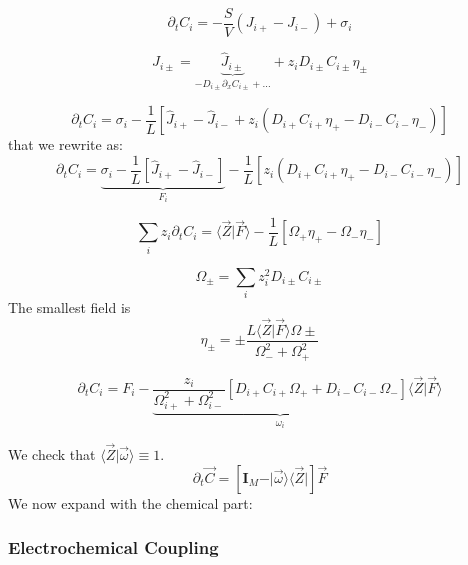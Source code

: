 \documentclass[aps,12pt]{revtex4}
\begin{document}
\begin{equation}
	\partial_t C_i = -\dfrac{S}{V}(J_{i+}-J_{i-}) + \sigma_i
\end{equation}

\begin{equation}
	J_{i\pm} = \underbrace{\hat J_{i\pm}}_{-D_{i\pm} \partial_x C_{i\pm}+\ldots} + z_i D_{i\pm} C_{i\pm} \eta_\pm
\end{equation}

\begin{equation}
	\partial_t C_i = \sigma_i -\dfrac{1}{L} \left[ \hat J_{i+}- \hat J_{i-} + z_i (D_{i+} C_{i+} \eta_+ - D_{i-}C_{i-} \eta_-) \right] 
\end{equation}
that we rewrite as:
\begin{equation}
	\partial_t C_i =
	 \underbrace{\sigma_i -\dfrac{1}{L} \left[ \hat J_{i+}- \hat J_{i-} \right]}_{F_i} 
	 - \dfrac{1}{L}  \left[ z_i (D_{i+} C_{i+} \eta_+ - D_{i-}C_{i-} \eta_-)\right] 
\end{equation}


\begin{equation}
	\sum_i z_i \partial_t C_i =  \langle \vec Z \vert \vec F \rangle - \dfrac{1}{L} \left[ \Omega_+ \eta_{+} - \Omega_- \eta_-\right]
\end{equation}

\begin{equation}
	\Omega_\pm = \sum_i z_i^2 D_{i\pm} C_{i\pm}
\end{equation}
The smallest field is 
\begin{equation}
	\eta_\pm = \pm \dfrac{L \langle \vec Z \vert \vec F \rangle \Omega\pm}{\Omega_-^2+\Omega_+^2}
\end{equation}

\begin{equation}
	\partial_t C_i = F_i - \underbrace{\dfrac{z_i}{\Omega_{i+}^2 + \Omega_{i-}^2} \left[ D_{i+} C_{i+} \Omega_+ + D_{i-} C_{i-} \Omega_- \right]}_{\omega_i} \langle \vec Z \vert \vec F \rangle
\end{equation}

We check that $\langle \vec Z \vert \vec \omega \rangle \equiv 1$.
\begin{equation}
\boxed{
	\partial_t \vec C = \left[\bm I_M - \vert\vec \omega \rangle \langle \vec Z \vert \right] \vec F
	}
\end{equation}
We now expand with the chemical part:


\subsubsection{Electrochemical Coupling}
\end{document}
